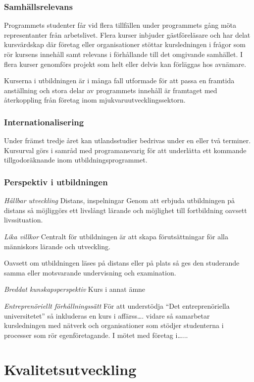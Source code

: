 \documentclass[swedish]{LnuCmThesis}
\begin{document}
\subsubsection*{Samhällsrelevans}
Programmets studenter får vid flera tillfällen under programmets gång möta representanter från arbetslivet. Flera kurser inbjuder gästföreläsare och har delat kursvärdskap där företag eller organisationer stöttar kursledningen i frågor som rör kursens innehåll samt relevans i förhållande till det omgivande samhället. I flera kurser genomförs projekt som helt eller delvis kan förläggas hos avnämare.

Kurserna i utbildningen är i många fall utformade för att passa en framtida anställning och stora delar av programmets innehåll är framtaget med återkoppling från företag inom mjukvaruutvecklingssektorn.

\subsubsection*{Internationalisering}
Under främst tredje året kan utlandsstudier bedrivas under en eller två terminer. Kursurval görs i samråd med programansvarig för att underlätta ett kommande tillgodoräknande inom utbildningsprogrammet.

\subsubsection*{Perspektiv i utbildningen}

\textit{Hållbar utveckling}
Distans, inspelningar
Genom att erbjuda utbildningen på distans så möjliggörs ett livslångt lärande och möjlighet till fortbildning oavsett livssituation.

\textit{Lika villkor}
Centralt för utbildningen är att skapa förutsättningar för alla människors lärande och utveckling. 

Oavsett om utbildningen läses på distans eller på plats så ges den studerande samma eller motsvarande undervisning och examination.

\textit{Breddat kunskapsperspektiv}
Kurs i annat ämne

\textit{Entreprenöriellt förhållningssätt}
För att understödja “Det entreprenöriella universitetet” så inkluderas en kurs i affärss…. vidare så samarbetar kursledningen med nätverk och organisationer som stödjer studenterna i processer som rör egenföretagande.
I mötet med företag i…...

\section*{Kvalitetsutveckling}
\end{document}
